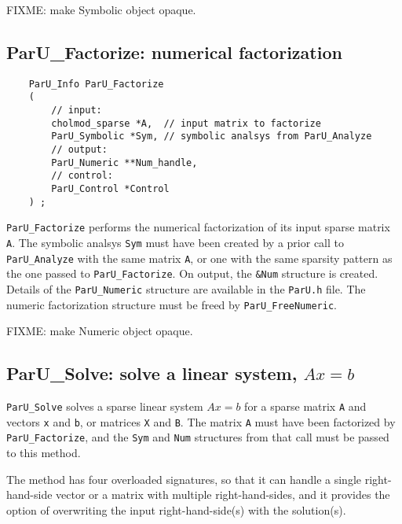 \documentclass[12pt]{article}
\begin{document}
    FIXME: make Symbolic object opaque.

\subsection{{\sf ParU\_Factorize}: numerical factorization}

    {\footnotesize
    \begin{verbatim}
    ParU_Info ParU_Factorize
    (
        // input:
        cholmod_sparse *A,  // input matrix to factorize
        ParU_Symbolic *Sym, // symbolic analsys from ParU_Analyze
        // output:
        ParU_Numeric **Num_handle,
        // control:
        ParU_Control *Control
    ) ; \end{verbatim}}

    \verb'ParU_Factorize' performs the numerical factorization of its input
    sparse matrix \verb'A'.  The symbolic analsys \verb'Sym' must have been
    created by a prior call to \verb'ParU_Analyze' with the same matrix
    \verb'A', or one with the same sparsity pattern as the one passed to
    \verb'ParU_Factorize'.  On output, the \verb'&Num' structure is created.
    Details of the \verb'ParU_Numeric' structure are available in the
    \verb'ParU.h' file.  The numeric factorization structure must be freed by
    \verb'ParU_FreeNumeric'.

    FIXME: make Numeric object opaque.

\subsection{{\sf ParU\_Solve}: solve a linear system, $Ax=b$}

    \verb'ParU_Solve' solves a sparse linear system $Ax=b$ for a sparse
    matrix \verb'A' and vectors \verb'x' and \verb'b', or matrices
    \verb'X' and \verb'B'.  The matrix \verb'A' must have been factorized
    by \verb'ParU_Factorize', and the \verb'Sym' and \verb'Num' structures
    from that call must be passed to this method.

    The method has four overloaded signatures, so that it can handle a single
    right-hand-side vector or a matrix with multiple right-hand-sides, and it
    provides the option of overwriting the input right-hand-side(s) with the
    solution(s).
\end{document}
